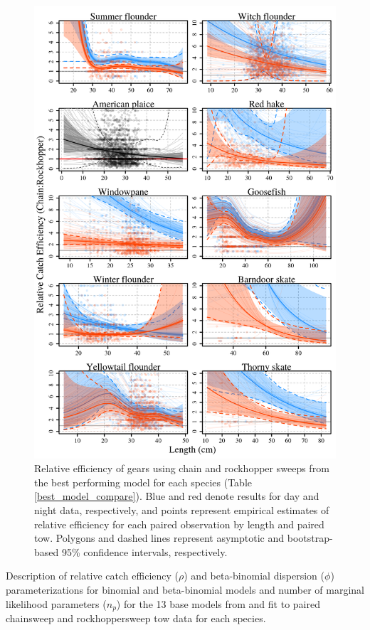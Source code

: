 \documentclass[]{article}
\begin{document}
\begin{figure}
\caption{Relative efficiency  of gears using chain and rockhopper sweeps from the best performing model for each species (Table \ref{best_model_compare}). Blue and red denote results for day and night data, respectively, and points represent empirical estimates of relative efficiency for each paired observation by length and paired tow. Polygons and dashed lines represent asymptotic and bootstrap-based 95\% confidence intervals, respectively.}\label{sp_rho_plot}
\begin{center}
\includegraphics[height = 0.8\textheight]{sp_rho_plot.png}
\end{center}
\end{figure}

\begin{landscape}
\begin{table}
\caption{Description of relative catch efficiency ($\rho$) and beta-binomial dispersion ($\phi$) parameterizations for binomial and beta-binomial models and number of marginal likelihood parameters ($n_p$) for the 13 base models from \citet{miller13} and fit to paired chainsweep and rockhoppersweep tow data for each species.}\label{base_model_description}
{}
\end{table}
\end{landscape}
\end{document}
